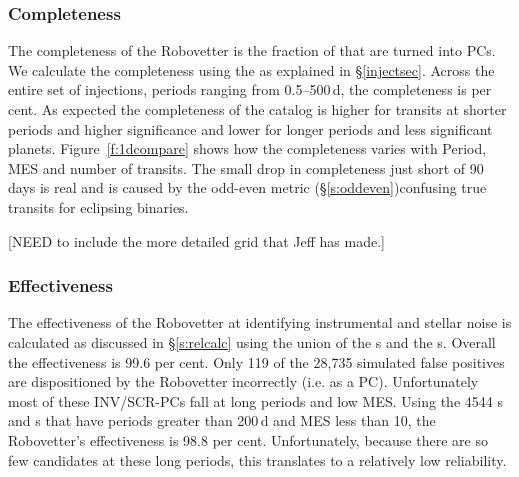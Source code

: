 
\subsubsection{Completeness}
The completeness of the Robovetter is the fraction of  that are turned into PCs.  We calculate the completeness using the  as explained in \S\ref{injectsec}.  
Across the entire set of injections, periods ranging from 0.5--500\,d, the completeness is \completeness{} per cent. As expected the completeness of the catalog is higher for transits at shorter periods and higher significance and lower for longer periods and less significant planets. Figure~\ref{f:1dcompare} shows how the completeness varies with Period, MES and number of transits. The small drop in completeness just short of 90\,days is real and is caused by the odd-even metric (\S\ref{s:oddeven})confusing true transits for eclipsing binaries.  

[NEED to include the more detailed grid that Jeff has made.]

\subsubsection{Effectiveness}
The effectiveness of the Robovetter at identifying instrumental and stellar noise is calculated as discussed in \S\ref{s:relcalc} using the union of the \invtce s and the \scrtce s. Overall the effectiveness is 99.6 per cent.  Only 119 of the 28,735 simulated false positives are dispositioned by the Robovetter incorrectly (i.e. as a PC).  Unfortunately most of these INV/SCR-PCs fall at long periods and low MES.
Using the 4544 \invtce s and \scrtce s that have periods greater than 200\,d and MES less than 10, the Robovetter's effectiveness is 98.8 per cent.  Unfortunately, because there are so few candidates at these long periods, this translates to a relatively low reliability.

